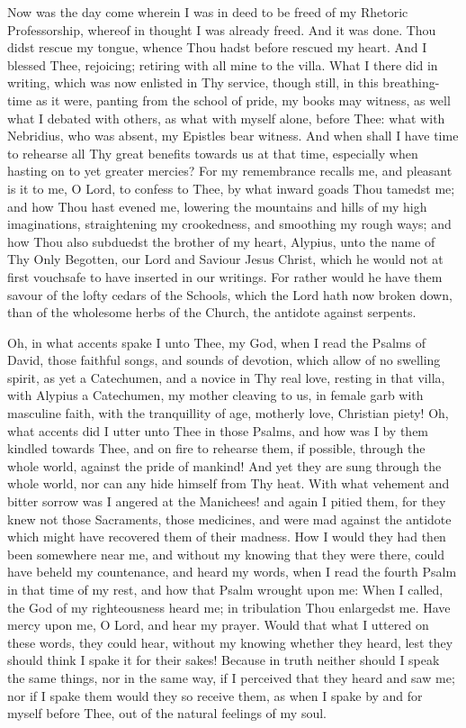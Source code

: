 \documentclass[b5paper,openright,12pt,twoside]{book}
\begin{document}
Now was the day come wherein I was in deed to be freed of my Rhetoric
Professorship, whereof in thought I was already freed. And it was done.
Thou didst rescue my tongue, whence Thou hadst before rescued my heart.
And I blessed Thee, rejoicing; retiring with all mine to the villa. What
I there did in writing, which was now enlisted in Thy service, though
still, in this breathing-time as it were, panting from the school of
pride, my books may witness, as well what I debated with others, as what
with myself alone, before Thee: what with Nebridius, who was absent, my
Epistles bear witness. And when shall I have time to rehearse all Thy
great benefits towards us at that time, especially when hasting on to
yet greater mercies? For my remembrance recalls me, and pleasant is it
to me, O Lord, to confess to Thee, by what inward goads Thou tamedst me;
and how Thou hast evened me, lowering the mountains and hills of my high
imaginations, straightening my crookedness, and smoothing my rough ways;
and how Thou also subduedst the brother of my heart, Alypius, unto the
name of Thy Only Begotten, our Lord and Saviour Jesus Christ, which
he would not at first vouchsafe to have inserted in our writings. For
rather would he have them savour of the lofty cedars of the Schools,
which the Lord hath now broken down, than of the wholesome herbs of the
Church, the antidote against serpents.

Oh, in what accents spake I unto Thee, my God, when I read the Psalms of
David, those faithful songs, and sounds of devotion, which allow of no
swelling spirit, as yet a Catechumen, and a novice in Thy real love,
resting in that villa, with Alypius a Catechumen, my mother cleaving to
us, in female garb with masculine faith, with the tranquillity of age,
motherly love, Christian piety! Oh, what accents did I utter unto Thee
in those Psalms, and how was I by them kindled towards Thee, and on
fire to rehearse them, if possible, through the whole world, against the
pride of mankind! And yet they are sung through the whole world, nor can
any hide himself from Thy heat. With what vehement and bitter sorrow was
I angered at the Manichees! and again I pitied them, for they knew not
those Sacraments, those medicines, and were mad against the antidote
which might have recovered them of their madness. How I would they
had then been somewhere near me, and without my knowing that they were
there, could have beheld my countenance, and heard my words, when I read
the fourth Psalm in that time of my rest, and how that Psalm wrought
upon me: When I called, the God of my righteousness heard me; in
tribulation Thou enlargedst me. Have mercy upon me, O Lord, and hear
my prayer. Would that what I uttered on these words, they could hear,
without my knowing whether they heard, lest they should think I spake
it for their sakes! Because in truth neither should I speak the same
things, nor in the same way, if I perceived that they heard and saw me;
nor if I spake them would they so receive them, as when I spake by and
for myself before Thee, out of the natural feelings of my soul.
\end{document}
